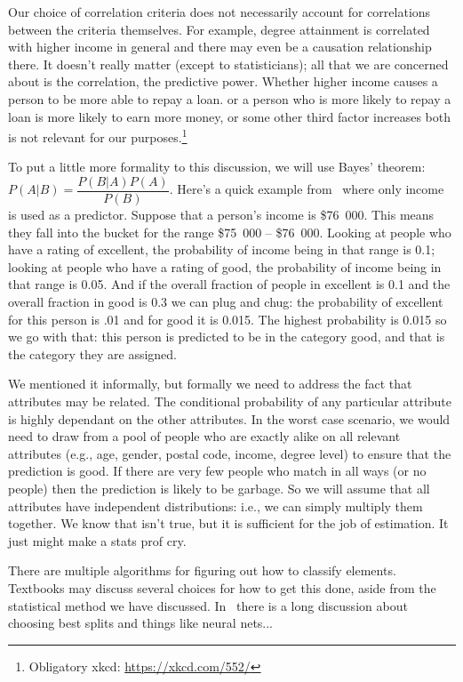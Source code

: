 Our choice of correlation criteria does not necessarily account for correlations between the criteria themselves. For example, degree attainment is correlated with higher income  in general and there may even be a causation relationship there. It doesn't really matter (except to statisticians); all that we are concerned about is the correlation, the predictive power. Whether higher income causes a person to be more able to repay a loan. or a person who is more likely to repay a loan is more likely to earn more money, or some other third factor increases both is not relevant for our purposes.\footnote{Obligatory xkcd: \url{https://xkcd.com/552/} }

To put a little more formality to this discussion, we will use Bayes' theorem: $P(A|B) = \dfrac{P(B|A)P(A)}{P(B)}$. Here's a quick example  from~\cite{dsc} where only income is used as a predictor. Suppose that a person's income is \$76~000. This means they fall into the bucket for the range \$75~000 -- \$76~000. Looking at people who have a rating of excellent, the probability of income being in that range is 0.1; looking at people who have a rating of good, the probability of income being in that range is 0.05. And if the overall fraction of people in excellent is 0.1 and the overall fraction in good is 0.3 we can plug and chug: the probability of excellent for this person is .01 and for good it is 0.015. The highest probability is 0.015 so we go with that: this person is predicted to be in the category good, and that is the category they are assigned.

We mentioned it informally, but formally we need to address the fact that attributes may be related. The conditional probability of any particular attribute is highly dependant on the other attributes. In the worst case scenario, we would need to draw from a pool of people who are exactly alike on all relevant attributes (e.g., age, gender, postal code, income, degree level) to ensure that the prediction is good. If there are very few people who match in all ways (or no people) then the prediction is likely to be garbage.  So we will assume that all attributes have independent distributions: i.e., we can simply multiply them together. We know that isn't true, but it is sufficient for the job of estimation. It just might make a stats prof cry.

There are multiple algorithms for figuring out how to classify elements. Textbooks may discuss several choices for how to get this done, aside from the statistical method we have discussed. In~\cite{dsc} there is a long discussion about choosing best splits and things like neural nets... 

